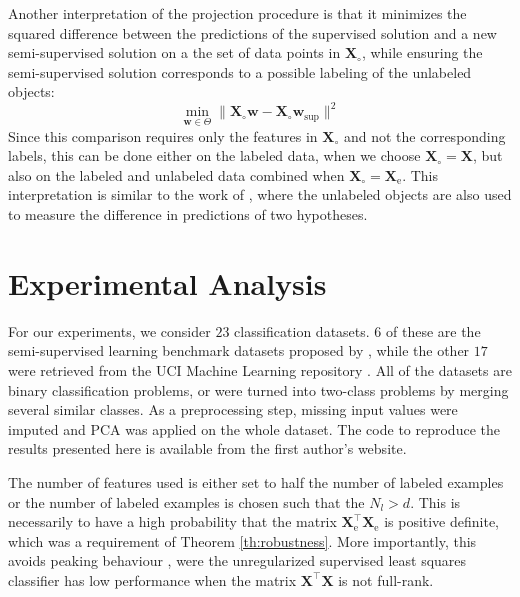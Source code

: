 \documentclass{article}
\newcommand{\Xe}{\vec{X}_\mathrm{e}  }
\renewcommand{\vec}[1]{\mathbf{#1}}
\begin{document}
Another interpretation of the projection procedure is that it minimizes the squared difference between the predictions of the supervised solution and a new semi-supervised solution on a the set of data points in $\vec{X}_{\circ}$, while ensuring the semi-supervised solution corresponds to a possible labeling of the unlabeled objects:
\begin{equation}
\min_{\vec{w} \in \Theta} \lVert \vec{X}_{\circ} \vec{w} - \vec{X}_{\circ} \vec{w}_\text{sup} \lVert^2
\end{equation}
Since this comparison requires only the features in $\vec{X}_{\circ}$ and not the corresponding labels, this can be done either on the labeled data, when we choose $\vec{X}_{\circ}=\vec{X}$, but also on the labeled and unlabeled data combined when $\vec{X}_{\circ}=\Xe$. This interpretation is similar to the work of \cite{Schuurmans2002}, where the unlabeled objects are also used to measure the difference in predictions of two hypotheses. 

\section{Experimental Analysis}
\label{section:empirical}
For our experiments, we consider $23$ classification datasets. $6$ of these are the semi-supervised learning benchmark datasets proposed by \citep{Chapelle2006}, while the other $17$ were retrieved from the UCI Machine Learning repository \citep{Bache2013}. All of the datasets are binary classification problems, or were turned into two-class problems by merging several similar classes. As a preprocessing step, missing input values were imputed and PCA was applied on the whole dataset. The code to reproduce the results presented here is available from the first author's website.

The number of features used is either set to half the number of labeled examples or the number of labeled examples is chosen such that the $N_l>d$. This is necessarily to have a high probability that the matrix $\vec{X}_\text{e}^\top \vec{X}_\text{e}$ is positive definite, which was a requirement of Theorem \ref{th:robustness}. More importantly, this avoids peaking behaviour \citep{Raudys1998, Opper1996}, were the unregularized supervised least squares classifier has low performance when the matrix $\vec{X}^\top \vec{X}$ is not full-rank. %
\end{document}

